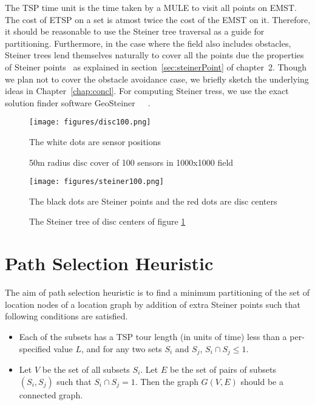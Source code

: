 The TSP time unit is the time taken by a MULE to visit all points on EMST. The cost of ETSP on a set is atmost twice the cost of the EMST on it. Therefore, it should be reasonable to use the Steiner tree traversal as a guide for partitioning. Furthermore, in the case where the field also includes obstacles, Steiner trees lend themselves naturally to cover all the points due the properties of Steiner points~\cite{oaest99} as explained in section~\ref{sec:steinerPoint} of chapter~2. Though we plan not to cover the obstacle avoidance case, we briefly sketch the underlying ideas in Chapter~\ref{chap:concl}. For computing Steiner tress, we use the exact solution finder software GeoSteiner~\cite{geosteiner1}~\cite{geosteiner2}~\cite{geosteiner3}. 


\begin{figure}[H]
\centering
\texttt{[image: figures/disc100.png]}
\caption{50m radius disc cover of 100 sensors in 1000x1000 field} \label{fig:disc100}
\medskip
\small
The white dots are sensor positions
\end{figure}

\begin{figure}[H]
\centering
\texttt{[image: figures/steiner100.png]}
\caption{The Steiner tree of disc centers of figure \ref{fig:disc100}}
\medskip
\small
The black dots are Steiner points and the red dots are disc centers
\end{figure}


\section{Path Selection Heuristic}

The aim of path selection heuristic is to find a minimum partitioning of
the set of location nodes of a location graph by addition of 
extra Steiner points such that following conditions are satisfied.

\begin{itemize}
\item Each of the subsets has a TSP tour length (in units of time) less than a per-specified value $L$, and for any two sets $S_{i}$ and $S_{j}$, $S_{i} \cap S_{j} \le 1$.
\item Let $V$ be the set of all subsets $S_{i}$. Let $E$ be the set of pairs of subsets $(S_{i},S_{j})$ such that $S_{i} \cap S_{j} = 1$. Then the graph $G(V,E)$ should be a connected graph.
\end{itemize}

